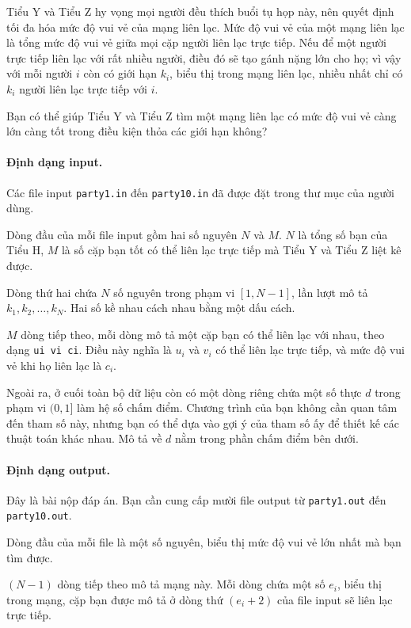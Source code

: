 \documentclass[11pt]{article}
\begin{document}
Tiểu Y và Tiểu Z hy vọng mọi người đều thích buổi tụ họp này, nên quyết định
tối đa hóa mức độ vui vẻ của mạng liên lạc. Mức độ vui vẻ của một mạng liên
lạc là tổng mức độ vui vẻ giữa mọi cặp người liên lạc trực tiếp. Nếu để một
người trực tiếp liên lạc với rất nhiều người, điều đó sẽ tạo gánh nặng lớn
cho họ; vì vậy với mỗi người $i$ còn có giới hạn $k_i$, biểu thị trong mạng
liên lạc, nhiều nhất chỉ có $k_i$ người liên lạc trực tiếp với $i$.

Bạn có thể giúp Tiểu Y và Tiểu Z tìm một mạng liên lạc có mức độ vui vẻ càng
lớn càng tốt trong điều kiện thỏa các giới hạn không?

\paragraph{Định dạng input.}
Các file input \texttt{party1.in} đến \texttt{party10.in} đã được đặt trong
thư mục của người dùng.

Dòng đầu của mỗi file input gồm hai số nguyên $N$ và $M$. $N$ là tổng số bạn
của Tiểu H, $M$ là số cặp bạn tốt có thể liên lạc trực tiếp mà Tiểu Y và Tiểu
Z liệt kê được.

Dòng thứ hai chứa $N$ số nguyên trong phạm vi $[1,N-1]$, lần lượt mô tả
$k_1,k_2,\ldots,k_N$. Hai số kề nhau cách nhau bằng một dấu cách.

$M$ dòng tiếp theo, mỗi dòng mô tả một cặp bạn có thể liên lạc với nhau, theo
dạng \texttt{ui vi ci}. Điều này nghĩa là $u_i$ và $v_i$ có thể liên lạc trực
tiếp, và mức độ vui vẻ khi họ liên lạc là $c_i$.

Ngoài ra, ở cuối toàn bộ dữ liệu còn có một dòng riêng chứa một số thực $d$
trong phạm vi $(0,1]$ làm hệ số chấm điểm. Chương trình của bạn không cần
quan tâm đến tham số này, nhưng bạn có thể dựa vào gợi ý của tham số ấy để
thiết kế các thuật toán khác nhau. Mô tả về $d$ nằm trong phần chấm điểm bên
dưới.

\paragraph{Định dạng output.}
Đây là bài nộp đáp án. Bạn cần cung cấp mười file output từ
\texttt{party1.out} đến \texttt{party10.out}.

Dòng đầu của mỗi file là một số nguyên, biểu thị mức độ vui vẻ lớn nhất mà
bạn tìm được.

$(N-1)$ dòng tiếp theo mô tả mạng này. Mỗi dòng chứa một số $e_i$, biểu thị
trong mạng, cặp bạn được mô tả ở dòng thứ $(e_i+2)$ của file input sẽ liên
lạc trực tiếp.
\end{document}
